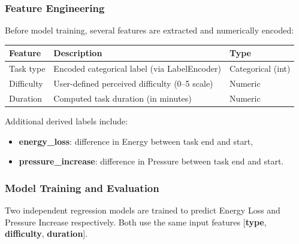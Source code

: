 \documentclass[12pt, a4paper]{article}
\begin{document}
        \subsubsection{Feature Engineering}
    
            Before model training, several features are extracted and numerically encoded:
    
            \begin{center}
                \begin{tabular}{l l l}
                    \toprule
                    \textbf{Feature} & \textbf{Description} & \textbf{Type} \\ \midrule   
                    Task type & Encoded categorical label (via LabelEncoder) & Categorical (int) \\
                    Difficulty & User-defined perceived difficulty (0–5 scale) & Numeric \\
                    Duration & Computed task duration (in minutes) & Numeric \\ \bottomrule
                \end{tabular}
            \end{center}
    
            Additional derived labels include:
            \begin{itemize}
                \item \textbf{energy\_loss}: difference in Energy between task end and start,
                \item \textbf{pressure\_increase}: difference in Pressure between task end and start.
            \end{itemize}
    
        \subsubsection{Model Training and Evaluation}
    
            Two independent regression models are trained to predict Energy Loss and Pressure Increase respectively. Both use the same input features [\textbf{type}, \textbf{difficulty}, \textbf{duration}].
\end{document}

